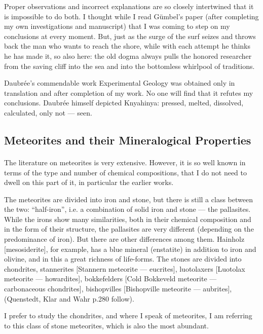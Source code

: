 \documentclass[a4paper, 12pt, oneside]{article}
\begin{document}
Proper observations and incorrect explanations are so closely intertwined that it is impossible to do both. I thought while I read Gümbel's paper (after completing my own investigations and manuscript) that I was coming to step on my conclusions at every moment. But, just as the surge of the surf seizes and throws back the man who wants to reach the shore, while with each attempt he thinks he has made it, so also here: the old dogma always pulls the honored researcher from the saving cliff into the sea and into the bottomless whirlpool of traditions.

Daubrée's commendable work Experimental Geology was obtained only in translation and after completion of my work. No one will find that it refutes my conclusions. Daubrée himself depicted Knyahinya: pressed, melted, dissolved, calculated, only not — seen.
\clearpage
\subsection{Meteorites and their Mineralogical Properties}
\paragraph{}
The literature on meteorites is very extensive. However, it is so well known in terms of the type and number of chemical compositions, that I do not need to dwell on this part of it, in particular the earlier works.

The meteorites are divided into iron and stone, but there is still a class between the two: ``half-iron'', i.e. a combination of solid iron and stone — the pallasites. While the irons show many similarities, both in their chemical composition and in the form of their structure, the pallasites are very different (depending on the predominance of iron). But there are other differences among them. Hainholz [mesosiderite], for example, has a blue mineral (enstatite) in addition to iron and olivine, and in this a great richness of life-forms. The stones are divided into chondrites, stannerites [Stannern meteorite — eucrites], luotolaxers [Luotolax meteorite — howardites], bokkefelders [Cold Bokkeveld meteorite — carbonaceous chondrites], bishopvilles [Bishopville meteorite — aubrites], (Quenstedt, Klar and Wahr p.280 follow).

I prefer to study the chondrites, and where I speak of meteorites, I am referring to this class of stone meteorites, which is also the most abundant.
\end{document}
